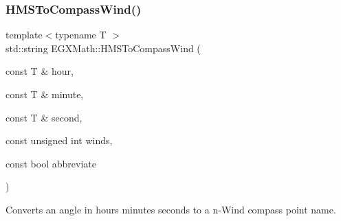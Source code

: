 \mbox{\label{group___e_g_x_math-_angle_conversions-_h_m_s_ga6374888f82360747241f6670e1b2048e}} 
\subsubsection{\texorpdfstring{H\+M\+S\+To\+Compass\+Wind()}{HMSToCompassWind()}}
{\footnotesize\ttfamily template$<$typename T $>$ \\
std\+::string E\+G\+X\+Math\+::\+H\+M\+S\+To\+Compass\+Wind (\begin{DoxyParamCaption}\item[{const T \&}]{hour,  }\item[{const T \&}]{minute,  }\item[{const T \&}]{second,  }\item[{const unsigned int}]{winds,  }\item[{const bool}]{abbreviate }\end{DoxyParamCaption})}



Converts an angle in hours minutes seconds to a n-\/\+Wind compass point name. 

